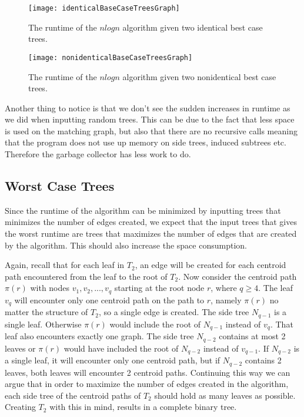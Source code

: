 \begin{figure}
	\texttt{[image: identicalBaseCaseTreesGraph]}
	\caption{The runtime of the $nlogn$ algorithm given two identical best case trees.}
	\label{identicalBaseCaseTreesGraph}
	\texttt{[image: nonidenticalBaseCaseTreesGraph]}
	\caption{The runtime of the $nlogn$ algorithm given two nonidentical best case trees.}
	\label{nonidenticalBaseCaseTreesGraph}
\end{figure}

Another thing to notice is that we don't see the sudden increases in runtime as we did when inputting random trees. This can be due to the fact that less space is used on the matching graph, but also that there are no recursive calls meaning that the program does not use up memory on side trees, induced subtrees etc. Therefore the garbage collector has less work to do.

\subsection{Worst Case Trees}
Since the runtime of the algorithm can be minimized by inputting trees that minimizes the number of edges created, we expect that the input trees that gives the worst runtime are trees that maximizes the number of edges that are created by the algorithm. This should also increase the space consumption.

Again, recall that for each leaf in $T_2$, an edge will be created for each centroid path encountered from the leaf to the root of $T_2$. Now consider the centroid path $\pi(r)$ with nodes $v_1, v_2, ..., v_q$ starting at the root node $r$, where $q \ge 4$. The leaf $v_q$ will encounter only one centroid path on the path to $r$, namely $\pi(r)$ no matter the structure of $T_2$, so a single edge is created. The side tree $N_{q-1}$ is a single leaf. Otherwise $\pi(r)$ would include the root of $N_{q-1}$ instead of $v_q$. That leaf also encounters exactly one graph. The side tree $N_{q-2}$ contains at most 2 leaves or $\pi(r)$ would have included the root of $N_{q-2}$ instead of $v_{q-1}$. If $N_{q-2}$ is a single leaf, it will encounter only one centroid path, but if $N_{q-2}$ contains 2 leaves, both leaves will encounter 2 centroid paths. Continuing this way we can argue that in order to maximize the number of edges created in the algorithm, each side tree of the centroid paths of $T_2$ should hold as many leaves as possible. Creating $T_2$ with this in mind, results in a complete binary tree.

